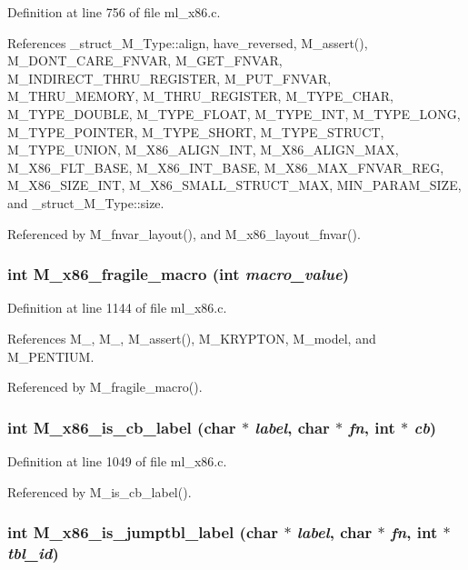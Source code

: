 Definition at line 756 of file ml\_\-x86.c.

References \_\-struct\_\-M\_\-Type::align, have\_\-reversed, M\_\-assert(), M\_\-DONT\_\-CARE\_\-FNVAR, M\_\-GET\_\-FNVAR, M\_\-INDIRECT\_\-THRU\_\-REGISTER, M\_\-PUT\_\-FNVAR, M\_\-THRU\_\-MEMORY, M\_\-THRU\_\-REGISTER, M\_\-TYPE\_\-CHAR, M\_\-TYPE\_\-DOUBLE, M\_\-TYPE\_\-FLOAT, M\_\-TYPE\_\-INT, M\_\-TYPE\_\-LONG, M\_\-TYPE\_\-POINTER, M\_\-TYPE\_\-SHORT, M\_\-TYPE\_\-STRUCT, M\_\-TYPE\_\-UNION, M\_\-X86\_\-ALIGN\_\-INT, M\_\-X86\_\-ALIGN\_\-MAX, M\_\-X86\_\-FLT\_\-BASE, M\_\-X86\_\-INT\_\-BASE, M\_\-X86\_\-MAX\_\-FNVAR\_\-REG, M\_\-X86\_\-SIZE\_\-INT, M\_\-X86\_\-SMALL\_\-STRUCT\_\-MAX, MIN\_\-PARAM\_\-SIZE, and \_\-struct\_\-M\_\-Type::size.

Referenced by M\_\-fnvar\_\-layout(), and M\_\-x86\_\-layout\_\-fnvar().
\subsubsection{\setlength{\rightskip}{0pt plus 5cm}int M\_\-x86\_\-fragile\_\-macro (int {\em macro\_\-value})}\label{ml__x86_8c_313d98d323e8127cb9628629177253a4}




Definition at line 1144 of file ml\_\-x86.c.

References M\_, M\_, M\_\-assert(), M\_\-KRYPTON, M\_\-model, and M\_\-PENTIUM.

Referenced by M\_\-fragile\_\-macro().
\subsubsection{\setlength{\rightskip}{0pt plus 5cm}int M\_\-x86\_\-is\_\-cb\_\-label (char $\ast$ {\em label}, char $\ast$ {\em fn}, int $\ast$ {\em cb})}\label{ml__x86_8c_ec6c548016ac4f178bb5abeb4d0b1e1e}




Definition at line 1049 of file ml\_\-x86.c.

Referenced by M\_\-is\_\-cb\_\-label().
\subsubsection{\setlength{\rightskip}{0pt plus 5cm}int M\_\-x86\_\-is\_\-jumptbl\_\-label (char $\ast$ {\em label}, char $\ast$ {\em fn}, int $\ast$ {\em tbl\_\-id})}\label{ml__x86_8c_3c8ee62d8ae26c67925595c7442f8109}




